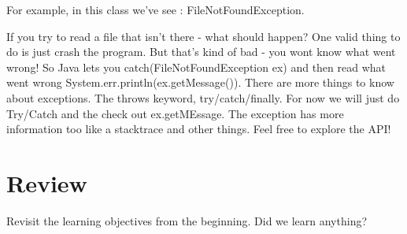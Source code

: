 \documentclass[12pt]{article}
\begin{document}
For example, in this class we've see :
FileNotFoundException.

If you try to read a file that isn't there - what should happen? One valid thing
to do is just crash the program. But that's kind of bad - you wont know what
went wrong! So Java lets you catch(FileNotFoundException ex) and then read what
went wrong System.err.println(ex.getMessage()). There are more things to know
about exceptions. The throws keyword, try/catch/finally. For now we will just do
Try/Catch and the check out ex.getMEssage. The exception has more information
too like a stacktrace and other things. Feel free to explore the API!


\section{Review}
Revisit the learning objectives from the beginning. Did we learn anything?
\end{document}
